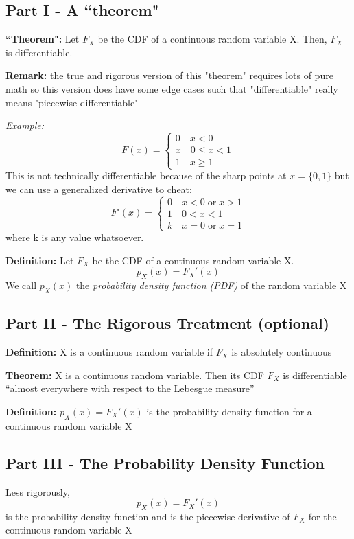 \documentclass[12pt]{article}
\begin{document}
\subsection*{Part I - A ``theorem"}
\textbf{``Theorem":} Let $F_X$ be the CDF of a continuous random variable X. Then, $F_X$ is differentiable. 

\textbf{Remark:} the true and rigorous version of this "theorem" requires lots of pure math so this version does have some edge cases such that "differentiable" really means "piecewise differentiable"

\emph{Example:}
\[F(x) = \begin{cases}
    0 \quad x < 0\\
    x \quad 0 \leq x < 1\\
    1 \quad x \geq 1
\end{cases}\]
This is not technically differentiable because of the sharp points at $x =\{0, 1\}$ but we can use a generalized derivative to cheat: 
\[F'(x) = \begin{cases}
    0 \quad x < 0\; \text{or}\; x > 1\\
    1 \quad 0 < x < 1\\
    k \quad x = 0 \; \text{or} \; x = 1
\end{cases}\]
where k is any value whatsoever. 

\textbf{Definition:} Let $F_X$ be the CDF of a continuous random variable X. 
\[p_X(x) = F_X'(x)\]
We call $p_X(x)$ the \emph{probability density function (PDF)} of the random variable X

\subsection*{Part II - The Rigorous Treatment (optional)}
\textbf{Definition:} X is a continuous random variable if $F_X$ is  absolutely continuous

\textbf{Theorem:} X is a continuous random variable. Then its CDF $F_X$ is differentiable ``almost everywhere with respect to the Lebesgue measure''

\textbf{Definition:} $p_X(x) = F_X'(x)$ is the probability density function for a continuous random variable X

\subsection*{Part III - The Probability Density Function}
Less rigorously, 
\[p_X(x) = F_X'(x)\]
is the probability density function and is the piecewise derivative of $F_X$ for the continuous random variable X
\end{document}
